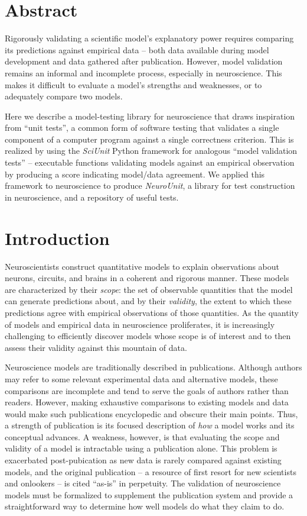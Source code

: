 \documentclass[11pt,letterpaper]{article}
\begin{document}
\section{Abstract}
Rigorously validating a scientific model’s explanatory power requires comparing its predictions against empirical data -- both data available during model development and data gathered after publication. 
However, model validation remains an informal and incomplete process, especially in neuroscience.   
This makes it difficult to evaluate a model's strengths and weaknesses, or to adequately compare two models.

Here we describe a model-testing library for neuroscience that draws inspiration from ``unit tests'', a common form of software testing that validates a single component of a computer program against a single correctness criterion. 
This is realized by using the \textit{SciUnit} Python framework for analogous ``model validation tests'' -- 
executable functions validating models against an empirical observation by producing a score indicating model/data agreement. 
We applied this framework to neuroscience to produce \textit{NeuroUnit}, a library for test construction in neuroscience, and a repository of useful tests.  

\section{Introduction}
Neuroscientists construct quantitative models to explain observations about neurons, circuits, and brains in a coherent and rigorous manner. 
These models are characterized by their \textit{scope}: the set of observable quantities that the model can generate predictions about, and by their \textit{validity}, the extent to which these predictions agree with empirical observations of those quantities. 
As the quantity of models and empirical data in neuroscience proliferates, it is increasingly challenging to efficiently discover models whose scope is of interest and to then assess their validity against this mountain of data. 

Neuroscience models are traditionally described in publications. 
Although authors may refer to some relevant experimental data and alternative models, these comparisons are incomplete and tend to serve the goals of authors rather than readers. 
However, making exhaustive comparisons to existing models and data would make such publications encyclopedic and obscure their main points. 
Thus, a strength of publication is its focused description of \textit{how} a model works and its conceptual advances. 
A weakness, however, is that evaluating the scope and validity of a model is intractable using a publication alone. 
This problem is exacerbated post-pubication as new data is rarely compared against existing models, and the original publication -- a resource of first resort for new scientists and onlookers -- is cited ``as-is'' in perpetuity. 	
The validation of neuroscience models must be formalized to supplement the publication system and provide a straightforward way to determine how well models do what they claim to do.  
\end{document}
